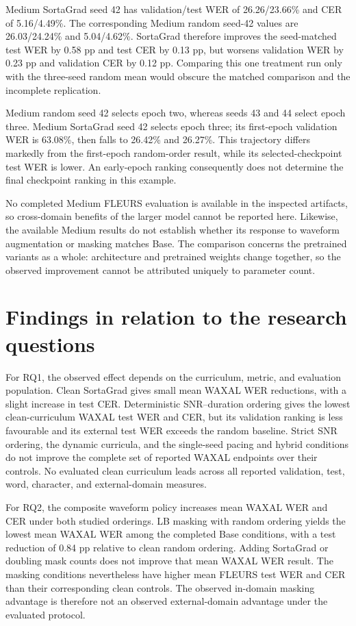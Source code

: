 \documentclass[12pt,a4paper]{report}
\begin{document}
Medium SortaGrad seed 42 has validation/test WER of 26.26/23.66\% and CER of 5.16/4.49\%. The corresponding Medium random seed-42 values are 26.03/24.24\% and 5.04/4.62\%. SortaGrad therefore improves the seed-matched test WER by 0.58 pp and test CER by 0.13 pp, but worsens validation WER by 0.23 pp and validation CER by 0.12 pp. Comparing this one treatment run only with the three-seed random mean would obscure the matched comparison and the incomplete replication.

Medium random seed 42 selects epoch two, whereas seeds 43 and 44 select epoch three. Medium SortaGrad seed 42 selects epoch three; its first-epoch validation WER is 63.08\%, then falls to 26.42\% and 26.27\%. This trajectory differs markedly from the first-epoch random-order result, while its selected-checkpoint test WER is lower. An early-epoch ranking consequently does not determine the final checkpoint ranking in this example.

No completed Medium FLEURS evaluation is available in the inspected artifacts, so cross-domain benefits of the larger model cannot be reported here. Likewise, the available Medium results do not establish whether its response to waveform augmentation or masking matches Base. The comparison concerns the pretrained variants as a whole: architecture and pretrained weights change together, so the observed improvement cannot be attributed uniquely to parameter count.

\section{Findings in relation to the research questions}

For RQ1, the observed effect depends on the curriculum, metric, and evaluation population. Clean SortaGrad gives small mean WAXAL WER reductions, with a slight increase in test CER. Deterministic SNR--duration ordering gives the lowest clean-curriculum WAXAL test WER and CER, but its validation ranking is less favourable and its external test WER exceeds the random baseline. Strict SNR ordering, the dynamic curricula, and the single-seed pacing and hybrid conditions do not improve the complete set of reported WAXAL endpoints over their controls. No evaluated clean curriculum leads across all reported validation, test, word, character, and external-domain measures.

For RQ2, the composite waveform policy increases mean WAXAL WER and CER under both studied orderings. LB masking with random ordering yields the lowest mean WAXAL WER among the completed Base conditions, with a test reduction of 0.84 pp relative to clean random ordering. Adding SortaGrad or doubling mask counts does not improve that mean WAXAL WER result. The masking conditions nevertheless have higher mean FLEURS test WER and CER than their corresponding clean controls. The observed in-domain masking advantage is therefore not an observed external-domain advantage under the evaluated protocol.
\end{document}
